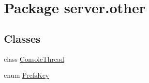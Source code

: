\hypertarget{namespaceserver_1_1other}{}\section{Package server.\+other}
\label{namespaceserver_1_1other}
\subsection*{Classes}
\begin{DoxyCompactItemize}
\item 
class \hyperlink{classserver_1_1other_1_1_console_thread}{Console\+Thread}
\item 
enum \hyperlink{enumserver_1_1other_1_1_prefs_key}{Prefs\+Key}
\end{DoxyCompactItemize}

